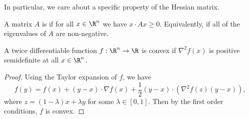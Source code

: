\documentclass[a4paper]{article}
\begin{document}
In particular, we care about a specific property of the Hessian matrix.

\begin{definition}
    A matrix $A$ is  if for all $x \in \R^n$ we have $x \cdot Ax \geq 0$. Equivalently, if all of the eigenvalues of $A$ are non-negative.
\end{definition}


\begin{proposition}
A twice differentiable function $f:\R^n \rightarrow \R$ is convex if $\nabla^2 f(x)$ is positive semidefinite at all $x \in \R^n$.
\end{proposition}
\begin{proof}
    Using the Taylor expansion of $f$, we have
    $$
f(y) = f(x) + (y - x) \cdot \nabla f(x) + \frac{1}{2}(y - x) \cdot ( \nabla^2f(z)(y - x)),
    $$
    where $z = (1 - \lambda)x + \lambda y$ for some $\lambda \in [0, 1]$. Then by the first order conditions, $f$ is convex.
\end{proof}


\end{document}
